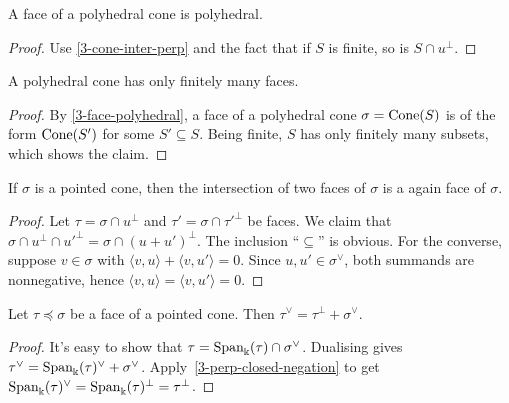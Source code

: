 \begin{lemma}
  \label{3-face-polyhedral}
  \leanok
  A face of a polyhedral cone is polyhedral.
\end{lemma}
\begin{proof}
  Use \ref{3-cone-inter-perp} and the fact that if \( S \) is finite,
  so is \( S \cap u^{\perp} \).
\end{proof}



\begin{lemma}
  \label{3-faces-polyhedral-cone-finite}
  A polyhedral cone has only finitely many faces.
\end{lemma}
\begin{proof}
  \uses{}
  By \ref{3-face-polyhedral}, a face of a polyhedral cone \( \sigma =
  \operatorname{Cone}(S) \) is of the form \( \operatorname{Cone}(S') \) for some \( S' \subseteq
  S \). Being finite, \( S \) has only finitely many subsets, which
  shows the claim.
\end{proof}


\begin{lemma}
  \label{3-face-intersection}
  \leanok
  If \( \sigma \) is a pointed cone, then the intersection of two
  faces of \( \sigma \) is a again face of \( \sigma \).
\end{lemma}
\begin{proof}
  \uses{}
  Let \( \tau = \sigma \cap u^{\perp} \) and \( \tau' = \sigma \cap
  \tau'^{\perp} \) be faces. We claim that \( \sigma \cap u^{\perp}
  \cap u'^{\perp} = \sigma \cap (u + u')^{\perp} \). The inclusion
  ``\( \subseteq \)'' is obvious. For the converse, suppose \( v \in
  \sigma \) with \( \langle v, u \rangle + \langle v, u' \rangle = 0
  \). Since \( u, u' \in \sigma^{\vee} \), both summands are
  nonnegative, hence \( \langle v, u \rangle = \langle v, u' \rangle =
  0 \).
\end{proof}

\begin{lemma}
  \label{3-face-dual-eq-sum}
  Let \( \tau \preceq \sigma \) be a face of a pointed cone. Then \(
  \tau^{\vee} = \tau^{\perp} + \sigma^{\vee} \).
\end{lemma}
\begin{proof}
  It's easy to show that \( \tau = \operatorname{Span}_{\Bbbk}(\tau) \cap
  \sigma^{\vee} \). Dualising gives \( \tau^{\vee} =
  \operatorname{Span}_{\Bbbk}(\tau)^{\vee} + \sigma^{\vee} \).
  Apply~\ref{3-perp-closed-negation} to get \(
  \operatorname{Span}_{\Bbbk}(\tau)^{\vee} = \operatorname{Span}_{\Bbbk}(\tau)^{\perp} =
  \tau^{\perp} \).
\end{proof}


